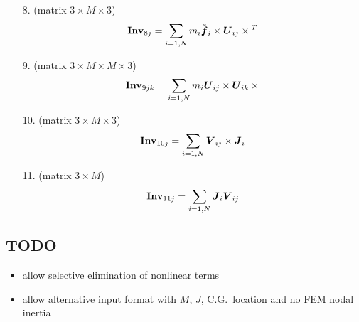 \begin{enumerate}
\item[8.]
(matrix $3\times{M}\times{3}$)
\begin{equation}
	\boldsymbol{\mathrm{Inv}}_{8j} =
		\sum_{i=1,N} m_i \tilde{\boldsymbol{f}}_{i} \times \boldsymbol{U}_{ij} \times{}^T
\end{equation}

\item[9.]
(matrix $3\times{M}\times{M}\times{3}$)
\begin{equation}
	\boldsymbol{\mathrm{Inv}}_{9jk} = \sum_{i=1,N} m_i \boldsymbol{U}_{ij} \times \boldsymbol{U}_{ik} \times{}
\end{equation}

\item[10.]
(matrix $3\times{M}\times{3}$)
\begin{equation}
	\boldsymbol{\mathrm{Inv}}_{10j} = \sum_{i=1,N} \boldsymbol{V}_{ij}\times \boldsymbol{J}_i
\end{equation}

\item[11.]
(matrix $3\times{M}$)
\begin{equation}
	\boldsymbol{\mathrm{Inv}}_{11j} = \sum_{i=1,N} \boldsymbol{J}_i \boldsymbol{V}_{ij}
\end{equation}

\end{enumerate}

\subsection{TODO}
\begin{itemize}
\item allow selective elimination of nonlinear terms
\item allow alternative input format with $M$, $J$, C.G.\ location
and no FEM nodal inertia
\end{itemize}
